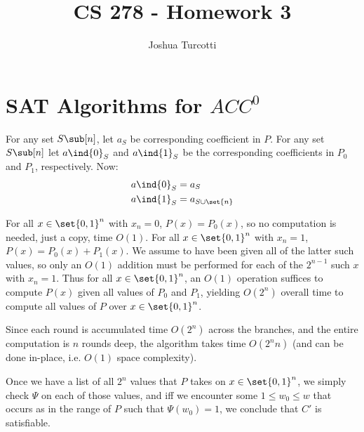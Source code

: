 \documentclass{article}
\title{CS 278 - Homework 3}
\author{Joshua Turcotti}
\begin{document}
\maketitle

\newcommand{\bset}{\set{0, 1}}
\section{SAT Algorithms for $ACC^0$}
\begin{alphalist}
\item For any set $S \sub [n]$, let $a_S$ be corresponding coefficient in $P$. For any set $S \sub [n]$ let $a\ind{0}_S$ and $a\ind{1}_S$ be the corresponding coefficients in $P_0$ and $P_1$, respectively. Now:
  \begin{align*}
    a\ind{0}_S &= a_S \\
    a\ind{1}_S &= a_{S \cup \set{n}}
  \end{align*}
\item For all $x \in \bset^n$ with $x_n = 0$, $P(x) = P_0(x)$, so no computation is needed, just a copy, time $O(1)$. For all $x \in \bset^n$ with $x_n = 1$, $P(x) = P_0(x) + P_1(x)$. We assume to have been given all of the latter such values, so only an $O(1)$ addition must be performed for each of the $2^{n-1}$ such $x$ with $x_n = 1$. Thus for all $x \in \bset^n$, an $O(1)$ operation suffices to compute $P(x)$ given all values of $P_0$ and $P_1$, yielding $O(2^n)$ overall time to compute all values of $P$ over $x \in \bset^n$.
\item Since each round is accumulated time $O(2^n)$ across the branches, and the entire computation is $n$ rounds deep, the algorithm takes time $O(2^n n)$ (and can be done in-place, i.e. $O(1)$ space complexity).
\item Once we have a list of all $2^n$ values that $P$ takes on $x \in \bset^n$, we simply check $\Psi$ on each of those values, and iff we encounter some $1 \le w_0 \le w$ that occurs as in the range of $P$ such that $\Psi(w_0) = 1$, we conclude that $C'$ is satisfiable. 
\end{alphalist}
\end{document}
